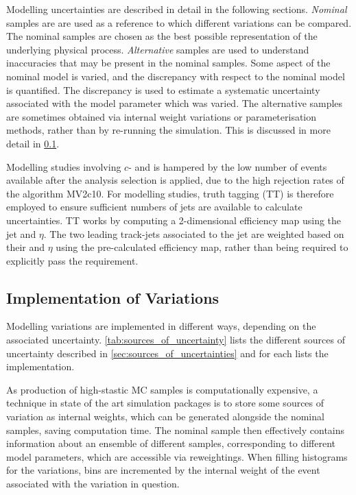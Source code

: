 Modelling uncertainties are described in detail in the following sections.
\textit{Nominal} samples are are used as a reference to which different variations can be compared.
The nominal samples are chosen as the best possible representation of the underlying physical process.
\textit{Alternative} samples are used to understand inaccuracies that may be present in the nominal samples.
Some aspect of the nominal model is varied, and the discrepancy with respect to the nominal model is quantified.
The discrepancy is used to estimate a systematic uncertainty associated with the model parameter which was varied.
The alternative samples are sometimes obtained via internal weight variations or parameterisation methods, rather than by re-running the simulation.
This is discussed in more detail in \cref{sec:implementation_of_variations}.

Modelling studies involving $c$- and \ljets is hampered by the low number of events available after the analysis selection is applied, due to the high rejection rates of the \btagging algorithm MV2c10.
For modelling studies, truth tagging (TT) is therefore employed to ensure sufficient numbers of jets are available to calculate uncertainties.
TT works by computing a 2-dimensional efficiency map using the jet \pt and $\eta$.
The two leading track-jets associated to the \largeR jet are weighted based on their \pt and $\eta$ using the pre-calculated efficiency map, rather than being required to explicitly pass the \btagging requirement.



\subsection{Implementation of Variations}\label{sec:implementation_of_variations}

Modelling variations are implemented in different ways, depending on the associated uncertainty.
\cref{tab:sources_of_uncertainty} lists the different sources of uncertainty described in \cref{sec:sources_of_uncertainties} and for each lists the implementation.
%

%
As production of high-stastic MC samples is computationally expensive, a technique in state of the art simulation packages is to store some sources of variation as internal weights, which can be generated alongside the nominal samples, saving computation time.
The nominal sample then effectively contains information about an ensemble of different samples, corresponding to different model parameters, which are accessible via reweightings. 
When filling histograms for the variations, bins are incremented by the internal weight of the event associated with the variation in question.

